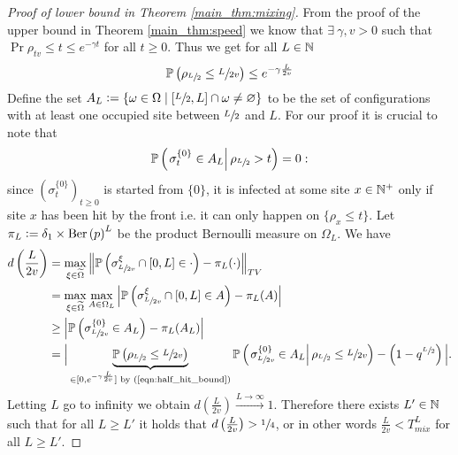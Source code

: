 \begin{proof}[Proof of lower bound in Theorem \ref{main_thm:mixing}]
From the proof of the upper bound in Theorem \ref{main_thm:speed} we know that $\exists\ \gamma, v > 0$ such that $\Pr{\rho_{tv} \leq t} \leq e^{- \gamma t}$ for all $ t \geq 0$. Thus we get for all $L \in \mathbb{N}$
\begin{equation}\nonumber
\mathbb{P} \left( \rho_{\sfrac{L}{2}} \leq \sfrac{L}{2v} \right) \leq e^{- \gamma \frac{L}{2v}} \\ \label{eqn:half_hit_bound}
\end{equation}
Define the set $A_L \vcentcolon= \{\omega \in \Omega \mid [\sfrac{L}{2},L] \cap \omega \neq \varnothing\}$ to be the set of configurations with at least one occupied site between $\sfrac{L}{2}$ and $L$. For our proof it is crucial to note that
\begin{equation}\nonumber
\mathbb{P} \left( \left. \sigma^{\{0\}}_t \in A_L \right| \rho_{\sfrac{L}{2}} > t \right) = 0:
\end{equation}
since $(\sigma^{\{0\}}_t)_{t \geq 0}$ is started from $\{0\}$, it is infected at some site $x \in \mathbb{N}^+$ only if site $x$ has been hit by the front i.e. it can only happen on $\{ \rho_x \leq t \}$. Let $\pi_L \vcentcolon= \delta_1 \times \text{Ber} \left( p \right)^L$ be the product Bernoulli measure on $\Omega_L$. We have
\begin{align*}
d\left(\frac{L}{2v}\right) &= \max\limits_{\xi \in \widetilde{\Omega}} \left\Vert \mathbb{P} \left( \sigma^\xi_{\sfrac{L}{2v}} \cap [0,L] \in \cdot \right) - \pi_L(\cdot)								   \right\Vert_{TV} \\
						   &= \max\limits_{\xi \in \widetilde{\Omega}} \max\limits_{A \in \Omega_L} \left| \mathbb{P} \left( \sigma^\xi_{\sfrac{L}{2v}} \cap [0,L] \in A \right) - \pi_L(A) \right|\\
						   &\geq \left| \mathbb{P} \left( \sigma^{\{0\}}_{\sfrac{L}{2v}} \in A_L \right) - \pi_L(A_L) \right| \\
						   &= \Big| \underbrace{\mathbb{P} \left( \rho_{\sfrac{L}{2}} \leq \sfrac{L}{2v} \right)}_{\in [0, e^{- \gamma \frac{L}{2v}}] \text{ by (\ref{eqn:half_hit_bound})}} \mathbb{P} \left( \left. \sigma^{\{0\}}_{\sfrac{L}{2v}} \in A_L \right| \rho_{\sfrac{L}{2}} \leq \sfrac{L}{2v} \right)  - \left( 1 - q^{\sfrac{L}{2}} \right) \Big|. \\
\end{align*}
Letting $L$ go to infinity we obtain $d\left(\frac{L}{2v}\right) \xrightarrow{L \rightarrow \infty} 1$. Therefore there exists $L' \in \mathbb{N}$ such that for all $L \geq L'$ it holds that $d\left(\frac{L}{2v}\right) > \sfrac{1}{4}$, or in other words $\frac{L}{2v} < T^L_{mix}$ for all $L \geq L'$.
\end{proof}